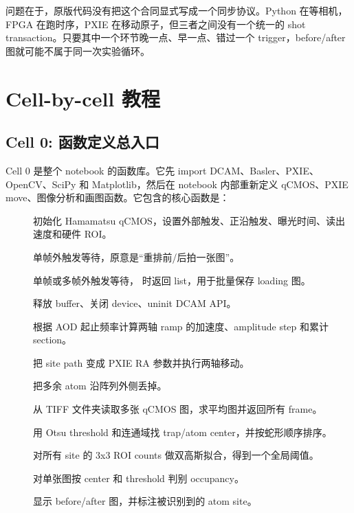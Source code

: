 \documentclass[11pt,oneside,openany]{book}
\begin{document}
问题在于，原版代码没有把这个合同显式写成一个同步协议。Python 在等相机，FPGA 在跑时序，PXIE 在移动原子，但三者之间没有一个统一的 shot transaction。只要其中一个环节晚一点、早一点、错过一个 trigger，before/after 图就可能不属于同一次实验循环。

\chapter{Cell-by-cell 教程}
\section{Cell 0: 函数定义总入口}
Cell 0 是整个 notebook 的函数库。它先 import DCAM、Basler、PXIE、OpenCV、SciPy 和 Matplotlib，然后在 notebook 内部重新定义 qCMOS、PXIE move、图像分析和画图函数。它包含的核心函数是：

\begin{description}
  \item[] 初始化 Hamamatsu qCMOS，设置外部触发、正沿触发、曝光时间、读出速度和硬件 ROI。
  \item[] 单帧外触发等待，原意是“重排前/后拍一张图”。
  \item[] 单帧或多帧外触发等待， 时返回 list，用于批量保存 loading 图。
  \item[] 释放 buffer、关闭 device、uninit DCAM API。
  \item[] 根据 AOD 起止频率计算两轴 ramp 的加速度、amplitude step 和累计 section。
  \item[] 把 site path 变成 PXIE RA 参数并执行两轴移动。
  \item[] 把多余 atom 沿阵列外侧丢掉。
  \item[] 从 TIFF 文件夹读取多张 qCMOS 图，求平均图并返回所有 frame。
  \item[] 用 Otsu threshold 和连通域找 trap/atom center，并按蛇形顺序排序。
  \item[] 对所有 site 的 3x3 ROI counts 做双高斯拟合，得到一个全局阈值。
  \item[] 对单张图按 center 和 threshold 判别 occupancy。
  \item[] 显示 before/after 图，并标注被识别到的 atom site。
\end{description}
\end{document}

